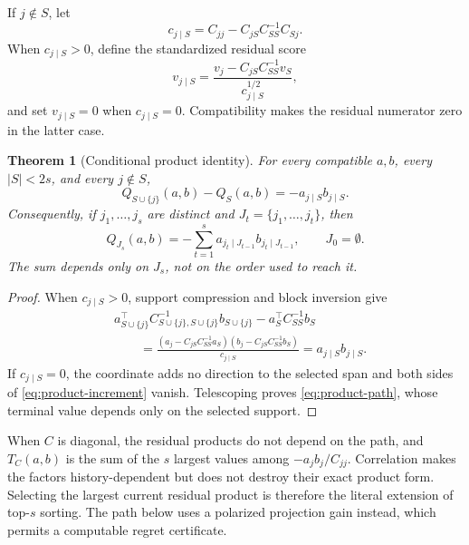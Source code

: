 \documentclass[a4paper,11pt,english]{article}
\newtheorem{theorem}{Theorem}[section]
\begin{document}
If $j\notin S$, let
\begin{equation*}
        c_{j\mid S}=C_{jj}-C_{jS}C_{SS}^{-1}C_{Sj}.
\end{equation*}
When $c_{j\mid S}>0$, define the standardized residual score
\begin{equation}\label{eq:residual-score}
        v_{j\mid S}
        =\frac{v_j-C_{jS}C_{SS}^{-1}v_S}{c_{j\mid S}^{1/2}},
\end{equation}
and set $v_{j\mid S}=0$ when $c_{j\mid S}=0$.  Compatibility makes the
residual numerator zero in the latter case.

\begin{theorem}[Conditional product identity]
\label{thm:conditional-product}
For every compatible $a,b$, every $|S|<2s$, and every $j\notin S$,
\begin{equation}\label{eq:product-increment}
        Q_{S\cup\{j\}}(a,b)-Q_S(a,b)
        =-a_{j\mid S}b_{j\mid S}.
\end{equation}
Consequently, if $j_1,\ldots,j_s$ are distinct and
$J_t=\{j_1,\ldots,j_t\}$, then
\begin{equation}\label{eq:product-path}
        Q_{J_s}(a,b)
        =-\sum_{t=1}^s
        a_{j_t\mid J_{t-1}}b_{j_t\mid J_{t-1}},
        \qquad J_0=\emptyset.
\end{equation}
The sum depends only on $J_s$, not on the order used to reach it.
\end{theorem}

\begin{proof}
When $c_{j\mid S}>0$, support compression and block inversion give
\begin{equation*}
\begin{split}
        &a_{S\cup\{j\}}^\top
        C_{S\cup\{j\},S\cup\{j\}}^{-1}b_{S\cup\{j\}}
        -a_S^\top C_{SS}^{-1}b_S\\
        &\qquad=
        \frac{(a_j-C_{jS}C_{SS}^{-1}a_S)
        (b_j-C_{jS}C_{SS}^{-1}b_S)}{c_{j\mid S}}
        =a_{j\mid S}b_{j\mid S}.
\end{split}
\end{equation*}
If $c_{j\mid S}=0$, the coordinate adds no direction to the selected
span and both sides of \eqref{eq:product-increment} vanish.  Telescoping
proves \eqref{eq:product-path}, whose terminal value depends only on the
selected support.
\end{proof}

When $C$ is diagonal, the residual products do not depend on the path,
and $T_C(a,b)$ is the sum of the $s$ largest values among
$-a_jb_j/C_{jj}$.  Correlation makes the factors history-dependent but
does not destroy their exact product form.  Selecting the largest current
residual product is therefore the literal extension of top-$s$ sorting.
The path below uses a polarized projection gain instead, which permits a
computable regret certificate.
\end{document}
